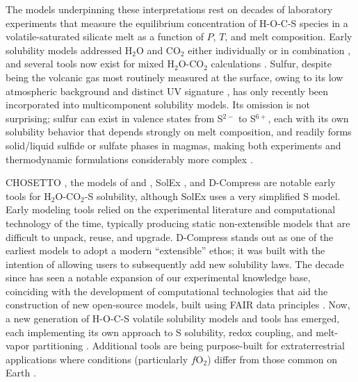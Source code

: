 \documentclass[draft, english]{volcanica-template}
\begin{document}
The models underpinning these interpretations rest on decades of laboratory experiments that measure the equilibrium concentration of H-O-C-S species in a volatile-saturated silicate melt as a function of $P$, $T$, and melt composition. Early solubility models addressed H$_2$O and CO$_2$ either individually or in combination \parencite[e.g.,][]{dixon1997, Newman2002, IaconoMarziano2012, iacovino2013, liu2005, allison2019}, and several tools now exist for mixed H$_2$O-CO$_2$ calculations \parencite[e.g.,][]{Newman2002,allison2022mafich,GhiorsoGualda2015,Iacovino2021,sun2026unified}. Sulfur, despite being the volcanic gas most routinely measured at the surface, owing to its low atmospheric background and distinct UV signature \parencite{oppenheimer2010ultraviolet}, has only recently been incorporated into multicomponent solubility models. Its omission is not surprising; sulfur can exist in valence states from S$^{2-}$ to S$^{6+}$, each with its own solubility behavior that depends strongly on melt composition, and readily forms solid/liquid sulfide or sulfate phases in magmas, making both experiments and thermodynamic formulations considerably more complex \parencite{baker2011modeling,fincham-richardson1954,o2002sulfide,jugo2005,carroll1985sulfide, Simon2026}.

CHOSETTO \parencite{moretti2003model,moretti2004oxidation}, the models of \textcite{gaillard2011atmospheric} and \textcite{gaillard2013geochemical}, SolEx \parencite{witham2012solex}, and D-Compress \parencite{Burgisser2015} are notable early tools for H$_2$O-CO$_2$-S solubility, although SolEx uses a very simplified S model. Early modeling tools relied on the experimental literature and computational technology of the time, typically producing static non-extensible models that are difficult to unpack, reuse, and upgrade. D-Compress stands out as one of the earliest models to adopt a modern ``extensible'' ethos; it was built with the intention of allowing users to subsequently add new solubility laws. The decade since has seen a notable expansion of our experimental knowledge base, coinciding with the development of computational technologies that aid the construction of new open-source models, built using FAIR data principles \parencite{wilkinson2016FAIR}. Now, a new generation of H-O-C-S volatile solubility models and tools has emerged, each implementing its own approach to S solubility, redox coupling, and melt-vapor partitioning \parencite[e.g.,][]{Liggins2020,Liggins2022,Sun2022,Sun2024,Ding2023,hughes2024,Hughes2025volfe, ghiorso2023melts+}. Additional tools are being purpose-built for extraterrestrial applications where conditions (particularly $f$O$_2$) differ from those common on Earth \parencite{bower2025diversity}.
\end{document}
